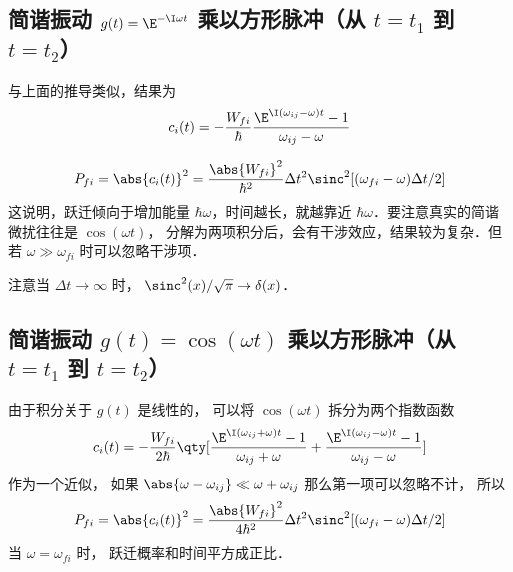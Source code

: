 \subsection{简谐振动 $g(t)= \E^{-\I\omega t}$ 乘以方形脉冲（从 $t=t_1$ 到 $t=t_2$）}
与上面的推导类似，结果为
\begin{equation}
c_i(t) = -\frac{W_{fi}}{\hbar} \frac{\E^{\I(\omega_{ij} - \omega)t} - 1}{\omega_{ij} - \omega}
\end{equation}

\begin{equation}
P_{fi} = \abs{c_i(t)}^2 = \frac{\abs{W_{fi}}^2}{\hbar^2} \Delta t^2 \sinc^2[(\omega_{fi}-\omega)\Delta t/2]
\end{equation}
这说明，跃迁倾向于增加能量 $\hbar\omega$，时间越长，就越靠近 $\hbar\omega$．要注意真实的简谐微扰往往是 $\cos(\omega t)$， 分解为两项积分后，会有干涉效应，结果较为复杂．但若 $\omega \gg \omega_{fi}$ 时可以忽略干涉项．

注意当 $\Delta t \to \infty$ 时， $\sinc^2(x)/\sqrt{\pi} \to \delta(x)$．

\subsection{简谐振动 $g(t)= \cos(\omega t)$ 乘以方形脉冲（从 $t=t_1$ 到 $t=t_2$）}
由于积分关于 $g(t)$ 是线性的， 可以将 $\cos(\omega t)$ 拆分为两个指数函数
\begin{equation}
c_i(t) = -\frac{W_{fi}}{2\hbar} \qty[\frac{\E^{\I(\omega_{ij} + \omega)t} - 1}{\omega_{ij} + \omega} + \frac{\E^{\I(\omega_{ij} - \omega)t} - 1}{\omega_{ij} - \omega}]
\end{equation}
作为一个近似， 如果 $\abs{\omega - \omega_{ij}} \ll \omega + \omega_{ij}$ 那么第一项可以忽略不计， 所以
\begin{equation}\label{TDPEx_eq1}
P_{fi} = \abs{c_i(t)}^2 = \frac{\abs{W_{fi}}^2}{4\hbar^2} \Delta t^2 \sinc^2[(\omega_{fi}-\omega)\Delta t/2]
\end{equation}
当 $\omega = \omega_{fi}$ 时， 跃迁概率和时间平方成正比．
